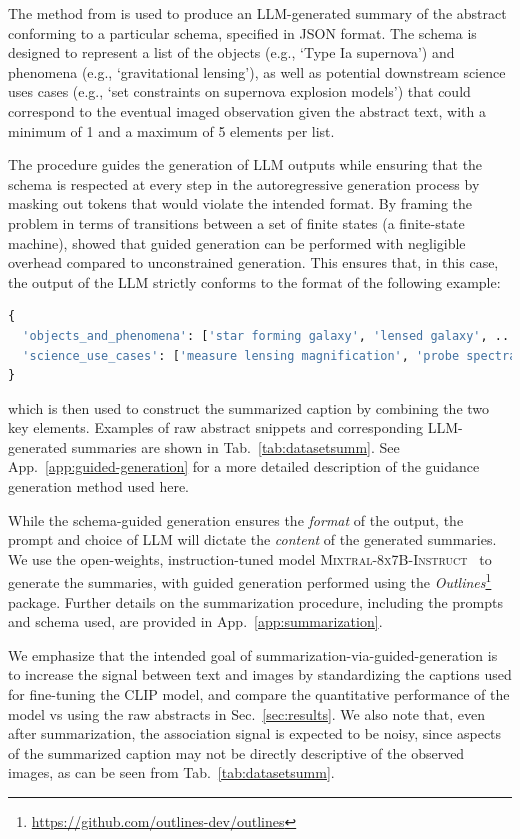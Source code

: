\documentclass[10pt]{article} %
\newcommand{\package}[1]{\textsl{#1}\xspace}
\begin{document}
The method from \cite{willard2023efficient} is used to produce an LLM-generated summary of the abstract conforming to a particular schema, specified in JSON format.
%
The schema is designed to represent a list of the objects (e.g., `Type Ia supernova') and phenomena (e.g., `gravitational lensing'), as well as potential downstream science uses cases (e.g., `set constraints on supernova explosion models') that could correspond to the eventual imaged observation given the abstract text, with a minimum of 1 and a maximum of 5 elements per list.

The procedure guides the generation of LLM outputs while ensuring that the schema is respected at every step in the autoregressive generation process by masking out tokens that would violate the intended format.
%
By framing the problem in terms of transitions between a set of finite states (a finite-state machine), \cite{willard2023efficient} showed that guided generation can be performed with negligible overhead compared to unconstrained generation.
%
This ensures that, in this case, the output of the LLM strictly conforms to the format of the following example:

\begin{lstlisting}[language=Python]
{
  'objects_and_phenomena': ['star forming galaxy', 'lensed galaxy', ...], 
  'science_use_cases': ['measure lensing magnification', 'probe spectral energy distributions', ...]
}
\end{lstlisting}

which is then used to construct the summarized caption by combining the two key elements.
%
Examples of raw abstract snippets and corresponding LLM-generated summaries are shown in Tab.~\ref{tab:datasetsumm}.
%
See App.~\ref{app:guided-generation} for a more detailed description of the guidance generation method used here.

While the schema-guided generation ensures the \emph{format} of the output, the prompt and choice of LLM will dictate the \emph{content} of the generated summaries.
%
We use the open-weights, instruction-tuned model \textsc{Mixtral-8x7B-Instruct}~\citep{jiang2024mixtral} to generate the summaries, with guided generation performed using the \package{Outlines}\footnote{\url{https://github.com/outlines-dev/outlines}} package.
%
Further details on the summarization procedure, including the prompts and schema used, are provided in App.~\ref{app:summarization}.

We emphasize that the intended goal of summarization-via-guided-generation is to increase the signal between text and images by standardizing the captions used for fine-tuning the CLIP model, and compare the quantitative performance of the model vs using the raw abstracts in Sec.~\ref{sec:results}.
%
We also note that, even after summarization, the association signal is expected to be noisy, since aspects of the summarized caption may not be directly descriptive of the observed images, as can be seen from Tab.~\ref{tab:datasetsumm}.
\end{document}
